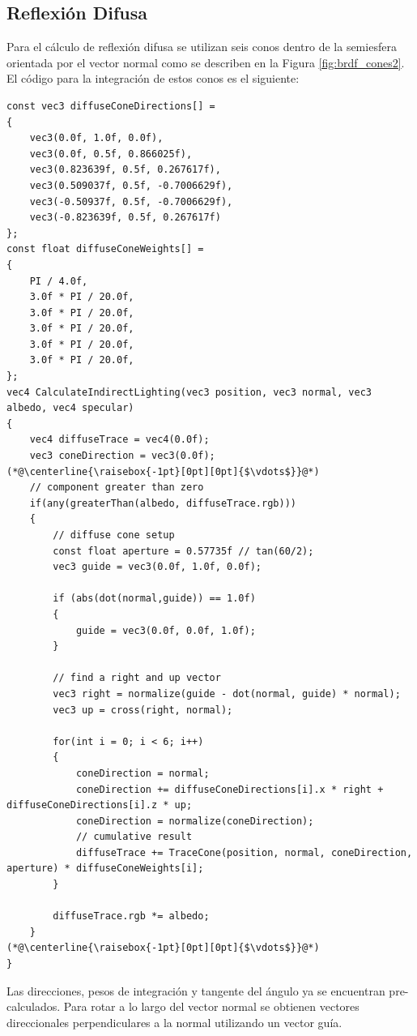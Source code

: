 \subsection{Reflexión Difusa} %
\label{sub:reflexion_difuse}
Para el cálculo de reflexión difusa se utilizan seis conos dentro de la semiesfera orientada por el vector normal como se describen en la Figura \ref{fig:brdf_cones2}. El código para la integración de estos conos es el siguiente:
\\
\begin{lstlisting}[caption={Conos para reflexión difusa.}, label=Trace3]
const vec3 diffuseConeDirections[] =
{
    vec3(0.0f, 1.0f, 0.0f),
    vec3(0.0f, 0.5f, 0.866025f),
    vec3(0.823639f, 0.5f, 0.267617f),
    vec3(0.509037f, 0.5f, -0.7006629f),
    vec3(-0.50937f, 0.5f, -0.7006629f),
    vec3(-0.823639f, 0.5f, 0.267617f)
};
const float diffuseConeWeights[] =
{
    PI / 4.0f,
    3.0f * PI / 20.0f,
    3.0f * PI / 20.0f,
    3.0f * PI / 20.0f,
    3.0f * PI / 20.0f,
    3.0f * PI / 20.0f,
};
vec4 CalculateIndirectLighting(vec3 position, vec3 normal, vec3 albedo, vec4 specular)
{
    vec4 diffuseTrace = vec4(0.0f);
    vec3 coneDirection = vec3(0.0f);
(*@\centerline{\raisebox{-1pt}[0pt][0pt]{$\vdots$}}@*)
    // component greater than zero
    if(any(greaterThan(albedo, diffuseTrace.rgb)))
    {
        // diffuse cone setup
        const float aperture = 0.57735f // tan(60/2);
        vec3 guide = vec3(0.0f, 1.0f, 0.0f);

        if (abs(dot(normal,guide)) == 1.0f)
        {
            guide = vec3(0.0f, 0.0f, 1.0f);
        }

        // find a right and up vector
        vec3 right = normalize(guide - dot(normal, guide) * normal);
        vec3 up = cross(right, normal);

        for(int i = 0; i < 6; i++)
        {
            coneDirection = normal;
            coneDirection += diffuseConeDirections[i].x * right + diffuseConeDirections[i].z * up;
            coneDirection = normalize(coneDirection);
            // cumulative result
            diffuseTrace += TraceCone(position, normal, coneDirection, aperture) * diffuseConeWeights[i];
        }

        diffuseTrace.rgb *= albedo;
    }
(*@\centerline{\raisebox{-1pt}[0pt][0pt]{$\vdots$}}@*)
}
\end{lstlisting}
Las direcciones, pesos de integración y tangente del ángulo ya se encuentran pre-calculados. Para rotar a lo largo del vector normal se obtienen vectores direccionales perpendiculares a la normal utilizando un vector guía.
